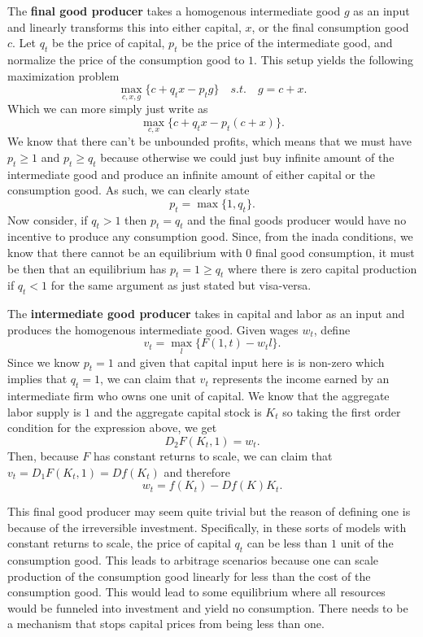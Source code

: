 \documentclass[11pt,english]{article}
\begin{document}
The \textbf{final good producer} takes a homogenous intermediate good $g$ as an input and linearly transforms this into either capital, $x$, or the final consumption good $c$. Let $q_t$ be the price of capital, $p_t$ be the price of the intermediate good, and normalize the price of the consumption good to $1$. This setup yields the following maximization problem
$$\max_{c,x,g}\{c + q_tx - p_tg\}\quad s.t.\quad g = c + x.$$Which we can more simply just write as $$\max_{c,x}\{c + q_tx - p_t(c+x)\}.$$We know that there can't be unbounded profits, which means that we must have $p_t \geq 1$ and $p_t \geq q_t$ because otherwise we could just buy infinite amount of the intermediate good and produce an infinite amount of either capital or the consumption good. As such, we can clearly state $$p_t = \max\{1, q_t\}.$$Now consider, if $q_t >1$ then $p_t = q_t$ and the final goods producer would have no incentive to produce any consumption good. Since, from the inada conditions, we know that there cannot be an equilibrium with 0 final good consumption, it must be then that an equilibrium has $p_t = 1 \geq q_t$ where there is zero capital production if $q_t < 1$ for the same argument as just stated but visa-versa.

The \textbf{intermediate good producer} takes in capital and labor as an input and produces the homogenous intermediate good. Given wages $w_t$, define $$v_t = \max_{l}\{F(1,t) - w_t l\}.$$ Since we know $p_t = 1$ and given that capital input here is is non-zero which implies that $q_t = 1$, we can claim that $v_t$ represents the income earned by an intermediate firm who owns one unit of capital. We know that the aggregate labor supply is $1$ and the aggregate capital stock is $K_t$ so taking the first order condition for the expression above, we get $$D_2F(K_t, 1) = w_t.$$ Then, because $F$ has constant returns to scale, we can claim that $v_t = D_1F(K_t, 1) = Df(K_t)$ and therefore $$w_t = f(K_t) - Df(K)K_t.$$

This final good producer may seem quite trivial but the reason of defining one is because of the irreversible investment. Specifically, in these sorts of models with constant returns to scale, the price of capital $q_t$ can be less than $1$ unit of the consumption good. This leads to arbitrage scenarios because one can scale production of the consumption good linearly for less than the cost of the consumption good. This would lead to some equilibrium where all resources would be funneled into investment and yield no consumption. There needs to be a mechanism that stops capital prices from being less than one.
\end{document}
